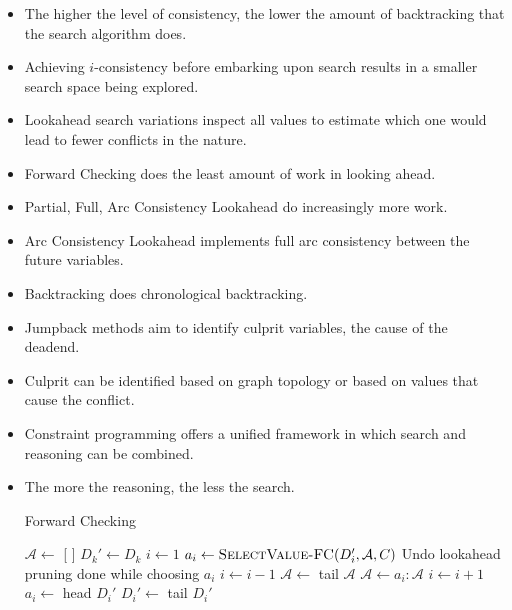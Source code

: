 \documentclass[a4paper]{article}
\begin{document}
\begin{itemize}
    \item The higher the level of consistency, the lower the amount of backtracking that the search algorithm does.
    \item Achieving $i$-consistency before embarking upon search results in a smaller search space being explored.
    \item Lookahead search variations inspect all values to estimate which one would lead to fewer conflicts in the nature.
    \item Forward Checking does the least amount of work in looking ahead.
    \item Partial, Full, Arc Consistency Lookahead do increasingly more work.
    \item Arc Consistency Lookahead implements full arc consistency between the future variables.
    \item Backtracking does chronological backtracking.
    \item Jumpback methods aim to identify culprit variables, the cause of the deadend.
    \item Culprit can be identified based on graph topology or based on values that cause the conflict.
    \item Constraint programming offers a unified framework in which search and reasoning can be combined.
    \item The more the reasoning, the less the search.
    \begin{algorithm}[H]
        \caption{Forward Checking}
        \begin{algorithmic}[1]
            \Statex {}
            \State $\mathcal{A}\gets$ [ ]
                \State $D_k'\gets D_k$
            \EndFor
            \State $i\gets 1$
                \State $a_i\gets \Call{SelectValue-FC}{D_i',\mathcal{A},C}$
                    \State Undo lookahead pruning done while choosing $a_i$
                    \State $i\gets i-1$
                    \State $\mathcal{A}\gets$ tail $\mathcal{A}$
                \Else
                    \State $\mathcal{A}\gets a_i:\mathcal{A}$
                    \State $i\gets i+1$
                \EndIf
            \EndWhile
            \State \Return {}
            \Statex
            \Statex {}
                \State $a_i\gets$ head $D_i'$
                \State $D_i'\gets$ tail $D_i'$

\end{algorithmic}
\end{algorithm}
\end{itemize}
\end{document}
